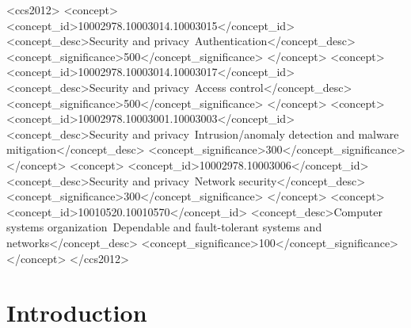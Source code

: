 \documentclass[acmlarge]{acmart}
\begin{document}
\begin{CCSXML}
<ccs2012>
 <concept>
  <concept_id>10002978.10003014.10003015</concept_id>
  <concept_desc>Security and privacy~Authentication</concept_desc>
  <concept_significance>500</concept_significance>
 </concept>
 <concept>
  <concept_id>10002978.10003014.10003017</concept_id>
  <concept_desc>Security and privacy~Access control</concept_desc>
  <concept_significance>500</concept_significance>
 </concept>
 <concept>
  <concept_id>10002978.10003001.10003003</concept_id>
  <concept_desc>Security and privacy~Intrusion/anomaly detection and malware mitigation</concept_desc>
  <concept_significance>300</concept_significance>
 </concept>
 <concept>
  <concept_id>10002978.10003006</concept_id>
  <concept_desc>Security and privacy~Network security</concept_desc>
  <concept_significance>300</concept_significance>
 </concept>
 <concept>
  <concept_id>10010520.10010570</concept_id>
  <concept_desc>Computer systems organization~Dependable and fault-tolerant systems and networks</concept_desc>
  <concept_significance>100</concept_significance>
 </concept>
</ccs2012>
\end{CCSXML}




\maketitle

\section{Introduction}
\end{document}
